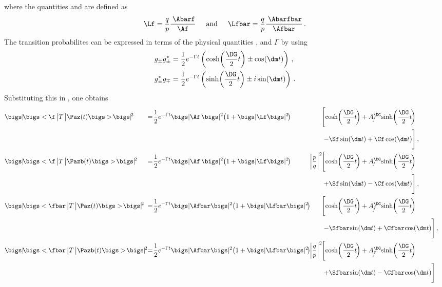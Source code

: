 where the quantities \Lf and \Lfbar are defined as
\begin{equation}
\Lf=\frac{q}{p}\frac{\kern 2.5pt \Abarf}{\Af}\hspace{0.5cm}\text{and}
\hspace{0.5cm}\Lfbar=\frac{q}{p}\frac{\kern 2.5pt \Abarfbar}{\Afbar}\,.\label{eq:defLambdas}
\end{equation}
The transition probabilites can be expressed in terms of the physical quantities \dm, \DG and $\Gamma$ by using
\begin{align}
g_{\pm}g_{\pm}^{*} &= \frac{1}{2}e^{-\Gamma t}\left(\cosh\!\left(\frac{\DG}{2}t\right)\pm\cos\!\left(\dm t\right)\right)\,,\\
g_{\pm}^*g_{\mp} &=  \frac{1}{2}e^{-\Gamma t}\left(\sinh\!\left(\frac{\DG}{2}t\right)\pm i\sin\!\left(\dm t\right)\right)\,.
\end{align}
Substituting this in , one obtains
\begin{align}
&\bigs|\!\bigs<{}\f\,\big|T\,\big|\Paz(t)\bigs>\!\bigs|^{\!2}\!\!\!\!\!\!&=
&\kern 1pt {\frac{1}{2}e^{-\Gamma t}\bigs|\Af\,\bigs|^2\!\left({}1+\bigs|\Lf\bigs|^2\!\right)}& &&
&\kern -11.0pt{\Bigg[\!\cosh\!\left({}\frac{\DG}{2}t\!\right) + A_{\kern -1.5pt f}^{\DG}\!\sinh\!\left({}\frac{\DG}{2}t\!\right)}&\nonumber\\
&& && && &\kern -7.5pt{-\Sf\sin\!\left(\dm t\right)+\Cf\cos\!\left(\dm t\right)\!\Bigg]}\,,&\label{eq:Ptof}\\
&\bigs|\!\bigs<{}\f\,\big|T\,\big|\Pazb(t)\bigs>\!\bigs|^{\!2}\!\!\!\!\!\!&=
&\kern 1pt {\frac{1}{2}e^{-\Gamma t}\bigs|\Af\,\bigs|^2\!\left({}1+\bigs|\Lf\bigs|^2\!\right)}& &\kern -10.5pt{\left|\frac{p}{q}\right|^2}&
&\kern -11.0pt{\Bigg[\!\cosh\!\left({}\frac{\DG}{2}t\!\right) + A_{\kern -1.5pt f}^{\DG}\!\sinh\!\left({}\frac{\DG}{2}t\!\right)}&\nonumber\\
&& && && &\kern -7.5pt{+\Sf\sin\!\left(\dm t\right)-\Cf\cos\!\left(\dm t\right)\!\Bigg]}\,,&\label{eq:Pbartof}\\
&\bigs|\!\bigs<{}\fbar\,\big|T\,\big|\Paz(t)\bigs>\!\bigs|^{\!2}\!\!\!\!\!\!&=
&\kern 1pt {\frac{1}{2}e^{-\Gamma t}\bigs|\Afbar\bigs|^2\!\left({}1+\bigs|\Lfbar\bigs|^2\!\right)}& &&
&\kern -11.0pt{\Bigg[\!\cosh\!\left({}\frac{\DG}{2}t\!\right) + A_{\kern 1.0pt\overline{\kern -2.5pt f\kern 1.0pt}}^{\DG}\!\sinh\!\left({}\frac{\DG}{2}t\!\right)}&\nonumber\\
&& && && &\kern -7.5pt{-\Sfbar\kern -0.1em\sin\!\left(\dm t\right)+\Cfbar\kern -0.1em\cos\!\left(\dm t\right)\!\Bigg]}\,,&\label{eq:Ptofbar}\\
&\bigs|\!\bigs<{}\fbar\,\big|T\,\big|\Pazb(t)\bigs>\!\bigs|^{\!2}\!\!\!\!\!\!&=
&\kern 1pt {\frac{1}{2}e^{-\Gamma t}\bigs|\Afbar\bigs|^2\!\left({}1+\bigs|\Lfbar\bigs|^2\!\right)}& &\kern -10.5pt{\left|\frac{q}{p}\right|^2}&
&\kern -11.0pt{\Bigg[\!\cosh\!\left({}\frac{\DG}{2}t\!\right) + A_{\kern 1.0pt\overline{\kern -2.5pt f\kern 1pt}}^{\DG}\!\sinh\!\left({}\frac{\DG}{2}t\!\right)}&\nonumber\\
&& && && &\kern -7.5pt{+\Sfbar\kern -0.1em \sin\!\left(\dm t\right)-\Cfbar\kern -0.1em\cos\!\left(\dm t\right)\!\Bigg]}&\label{eq:Pbartofbar}
\end{align}
